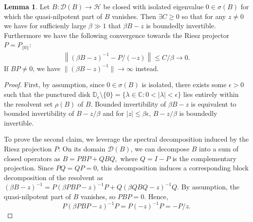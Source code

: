 \documentclass[reqno,12pt,letterpaper]{amsart}
\numberwithin{equation}{section}
\newcommand{\1}{\mathds{1}}
\theoremstyle{definition}
\newtheorem{Lem}[Th]{Lemma}
\begin{document}
\begin{Lem}\label{conv_to_projection}
	Let $B: \mathcal{D}(B) \rightarrow \mathcal{H}$ be closed  with  isolated eigenvalue $0\in \sigma(B)$  for which the quasi-nilpotent part of $B$ vanishes. Then $ \exists C \geq 0$ so that for any $z \neq 0$ we have for sufficienly large $\beta \gg 1$ that $\beta B - z$ is boundedly invertible. Furthermore we have  the following  convergence  towards the Riesz projector $P = P_{\{0\}} $:
	\begin{align}\label{convergence_to_projection}
		\left\|(\beta B - z)^{-1} - P/(-z) \right\| \leq C/\beta \longrightarrow 0.
	\end{align}
	If $B P \neq 0$, we have $\|(\beta B - z)^{-1} \| \rightarrow \infty$ instead.
\end{Lem}
\begin{proof}
	First, by assumption, since $0 \in \sigma(B)$ is isolated, 
	there exists some $\epsilon > 0$ such that the punctured disk
	$
	\mathbb{D}_\epsilon \setminus \{0\} = \{ \lambda \in \mathbb{C} : 0 < |\lambda| < \epsilon \}
	$
	lies entirely within the resolvent set $\rho(B)$ of $B$. Bounded invertibility of $\beta B - z$ is equivalent to bounded invertibility of
	$
	B - z/\beta
	$
	and for $|z| \leq \beta \epsilon$, $ B - z/\beta$ is boundedly invertible.
	
	
	
	To prove the second claim, we leverage the spectral decomposition induced by the Riesz projection $P$:
	On its domain $\mathcal{D}(B)$, we can decompose $B$ into a sum of closed operators as
	$
	B = P B P + Q B Q,
	$
	where $Q = I - P$ is the complementary projection. 
	Since $PQ = QP = 0$, this decomposition induces a corresponding block decomposition of the resolvent as
	$
	(\beta B - z)^{-1} = P (\beta P B P - z)^{-1} P + Q (\beta Q B Q - z)^{-1} Q.
	$
	By assumption, the quasi-nilpotent part of $B$ vanishes, so $P B P = 0$. Hence,
	\[
	P (\beta P B P - z)^{-1} P = P (-z)^{-1} P = - P/z.
	\]
	

\end{proof}
\end{document}
